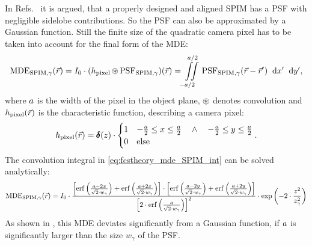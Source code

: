 In Refs.~\cite{WOHLAND2010,SINGHKRIEGER2013,KRIEGERPHD2014} it is argued, that a properly designed and aligned SPIM has a PSF with negligible sidelobe contributions. So the PSF can also be approximated by a Gaussian function. Still the finite size of the quadratic camera pixel has to be taken into account for the final form of the MDE:
\begin{equation}\label{eq:fcstheory_mde_SPIM_int}
  \operatorname{MDE}_{{\text{SPIM,}} \gamma}(\vec{r})=I_0\cdot (h_{\text{pixel}}\operatorname{\circledast}\operatorname{PSF}_{{\text{SPIM,}} \gamma})(\vec{r})=\iint\limits_{-a/2\ \ }^{\ \ a/2} \operatorname{PSF}_{{\text{SPIM,}} \gamma}(\vec{r}-\vec{r}')\;\;\mathrm{d}x'\;\;\mathrm{d}y',
\end{equation}
where $a$ is the width of the pixel in the object plane, $\operatorname{\circledast}$ denotes convolution and $h_{\text{pixel}}(\vec{r})$ is the characteristic function, describing a camera pixel:
\begin{equation}\label{eq:imaging_CEF}
  h_\txt{pixel}(\vr)=\ddelta(z)\cdot\begin{cases}1 & -\frac{\pixelsize}{2}\leq x\leq\frac{\pixelsize}{2}\ \ \ \wedge\ \ \ -\frac{\pixelsize}{2}\leq y\leq\frac{\pixelsize}{2}\\ 0 & \text{else}\end{cases}.
\end{equation}
The convolution integral in \eqref{eq:fcstheory_mde_SPIM_int} can be solved analytically:
\begin{equation}\label{eq:fcstheory_mde_SPIM}
 \operatorname{MDE}_{{\text{SPIM,}} \gamma}(\vec{r})=I_0\cdot\frac{\left[\operatorname{erf}\left(\frac{a-2x}{\sqrt{2}\cdot w_\gamma}\right)+\operatorname{erf}\left(\frac{a+2x}{\sqrt{2}\cdot w_\gamma}\right)\right]\cdot\left[\operatorname{erf}\left(\frac{a-2y}{\sqrt{2}\cdot w_\gamma}\right)+\operatorname{erf}\left(\frac{a+2y}{\sqrt{2}\cdot w_\gamma}\right)\right]}{\left[2\cdot\operatorname{erf}\left(\frac{a}{\sqrt{2}\cdot w_\gamma}\right)\right]^2}\cdot\exp\left(-2\cdot\frac{z^2}{z_\gamma^2}\right)
\end{equation}
As shown in , this MDE deviates significantly from a Gaussian function, if $a$ is significantly larger than the size $w_\gamma$ of the PSF. 



